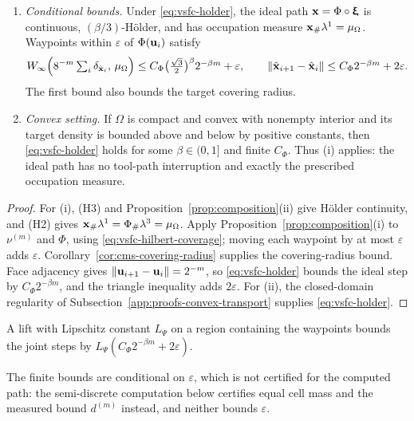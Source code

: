 \begin{theorem}
  \label{thm:vsfc-guarantees}
  \begin{enumerate}[label=(\roman*)]
    \item \emph{Conditional bounds.} Under \eqref{eq:vsfc-holder}, the ideal path ${\bm{\mathrm{x}}}=\Phi\circ{\bm{\mathrm{\upxi}}}$ is continuous, $(\beta/3)$-H\"older, and has occupation measure ${\bm{\mathrm{x}}}_\#\lambda^1=\mu_\Omega$. Waypoints within $\varepsilon$ of $\Phi({\bm{\mathrm{u}}}_i)$ satisfy
          \begin{equation}
            \label{eq:vsfc-bounds}
            W_\infty\Bigl(8^{-m}\textstyle\sum_i\delta_{\hat {\bm{\mathrm{x}}}_i},\,\mu_\Omega\Bigr)
            \leq C_\Phi\bigl(\tfrac{\sqrt3}{2}\bigr)^{\beta}2^{-\beta m}+\varepsilon,
            \qquad
            \|\hat {\bm{\mathrm{x}}}_{i+1}-\hat {\bm{\mathrm{x}}}_i\|\leq C_\Phi2^{-\beta m}+2\varepsilon.
          \end{equation}
          The first bound also bounds the target covering radius.
    \item \emph{Convex setting.} If $\Omega$ is compact and convex with nonempty interior and its target density is bounded above and below by positive constants, then \eqref{eq:vsfc-holder} holds for some $\beta\in(0,1]$ and finite $C_\Phi$. Thus (i) applies: the ideal path has no tool-path interruption and exactly the prescribed occupation measure.
  \end{enumerate}
\end{theorem}
\begin{proof}
  For (i), (H3) and Proposition~\ref{prop:composition}(ii) give H\"older continuity, and (H2) gives ${\bm{\mathrm{x}}}_\#\lambda^1=\Phi{}_\#\lambda^3=\mu_\Omega$. Apply Proposition~\ref{prop:composition}(i) to $\nu^{(m)}$ and $\Phi$, using \eqref{eq:vsfc-hilbert-coverage}; moving each waypoint by at most $\varepsilon$ adds $\varepsilon$. Corollary~\ref{cor:cms-covering-radius} supplies the covering-radius bound. Face adjacency gives $\|{\bm{\mathrm{u}}}_{i+1}-{\bm{\mathrm{u}}}_i\|=2^{-m}$, so \eqref{eq:vsfc-holder} bounds the ideal step by $C_\Phi2^{-\beta m}$, and the triangle inequality adds $2\varepsilon$. For (ii), the closed-domain regularity of Subsection~\ref{app:proofs-convex-transport} supplies \eqref{eq:vsfc-holder}.
\end{proof}
A lift with Lipschitz constant $L_\Psi$ on a region containing the waypoints bounds the joint steps by $L_\Psi(C_\Phi2^{-\beta m}+2\varepsilon)$.

The finite bounds are conditional on $\varepsilon$, which is not certified for the computed path: the semi-discrete computation below certifies equal cell mass and the measured bound $d^{(m)}$ instead, and neither bounds $\varepsilon$.

